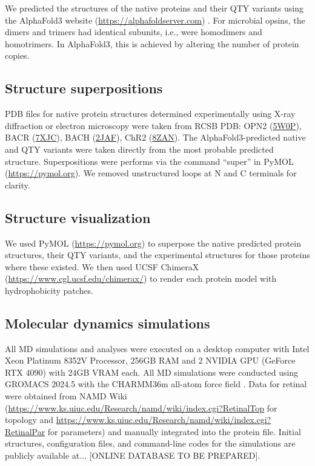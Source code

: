 \documentclass[fleqn,10pt,lineno]{manuscript}
\begin{document}
We predicted the structures of the native proteins and their QTY variants using the AlphaFold3 website (\url{https://alphafoldserver.com}) \citep{Abramson_2024}. For microbial opsins, the dimers and trimers had identical subunits, i.e., were homodimers and homotrimers. In AlphaFold3, this is achieved by altering the number of protein copies. 

\subsection*{Structure superpositions}

PDB files for native protein structures determined experimentally using X-ray diffraction or electron microscopy were taken from RCSB PDB: OPN2 (\href{https://www.rcsb.org/structure/5W0P}{5W0P}), BACR (\href{https://www.rcsb.org/structure/7XJC}{7XJC}), BACH (\href{https://www.rcsb.org/structure/2JAF}{2JAF}), ChR2 (\href{https://www.rcsb.org/structure/8ZAN}{8ZAN}). The AlphaFold3-predicted native and QTY variants were taken directly from the most probable predicted structure. Superpositions were performs via the command ``super'' in PyMOL (\url{https://pymol.org}). We removed unstructured loops at N and C terminals for clarity. 

\subsection*{Structure visualization}

We used PyMOL (\url{https://pymol.org}) to superpose the native predicted protein structures, their QTY variants, and the experimental structures for those proteins where these existed. We then used UCSF ChimeraX (\url{https://www.cgl.ucsf.edu/chimerax/}) to render each protein model with hydrophobicity patches.  

\subsection*{Molecular dynamics simulations}

All MD simulations and analyses were executed on a desktop computer with Intel Xeon Platinum 8352V Processor, 256GB RAM and 2 NVIDIA GPU (GeForce RTX 4090) with 24GB VRAM each. All MD simulations were conducted using GROMACS 2024.5 \citep{Abraham_2015} with the CHARMM36m all-atom force field \citep{Huang_2017}. Data for retinal were obtained from NAMD Wiki (\url{https://www.ks.uiuc.edu/Research/namd/wiki/index.cgi?RetinalTop} for topology and \url{https://www.ks.uiuc.edu/Research/namd/wiki/index.cgi?RetinalPar} for parameters) and manually integrated into the protein file. Initial structures, configuration files, and command-line codes for the simulations are publicly available at... [ONLINE DATABASE TO BE PREPARED]. 
\end{document}
